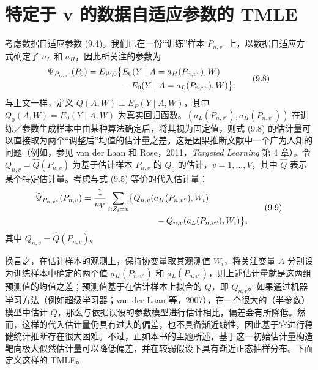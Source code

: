 \section{特定于 v 的数据自适应参数的 TMLE}

考虑数据自适应参数 (9.4)。我们已在一份“训练”样本 $P_{n,v^c}$ 上，以数据自适应方式确定了 $a_L$ 和 $a_H$，因此所关注的参数为
\begin{equation}
\begin{aligned}
\Psi_{P_{n,v^c}}(P_0)
={}&E_{W,0}\bigl\{E_0(Y\mid A=a_H(P_{n,v^c}),W)\\
&\hspace{2.6em}-E_0(Y\mid A=a_L(P_{n,v^c}),W)\bigr\}.
\end{aligned}
\tag{9.8}
\end{equation}
与上文一样，定义 $Q(A,W)\equiv E_P(Y\mid A,W)$，其中 $Q_0(A,W)=E_0(Y\mid A,W)$ 为真实回归函数。$(a_L(P_{n,v^c}),a_H(P_{n,v^c}))$ 在训练／参数生成样本中由某种算法确定后，将其视为固定值，则式 (9.8) 的估计量可以直接取为两个“调整后”均值的估计量之差。这是因果推断文献中一个广为人知的问题（例如，参见 van der Laan 和 Rose，2011，\emph{Targeted Learning} 第 4 章）。令 $Q_{n,v}=\hat Q(P_{n,v})$ 为基于估计样本 $P_{n,v}$ 的 $Q_0$ 的估计，$v=1,\ldots,V$，其中 $\hat Q$ 表示某个特定估计量。考虑与式 (9.5) 等价的代入估计量：
\begin{equation}
\begin{aligned}
\hat\Psi_{P_{n,v^c}}(P_{n,v})
={}&\frac1{n_V}\sum_{i:Z_i=v}\bigl\{Q_{n,v}(a_H(P_{n,v^c}),W_i)\\
&\hspace{7.3em}-Q_{n,v}(a_L(P_{n,v^c}),W_i)\bigr\},
\end{aligned}
\tag{9.9}
\end{equation}
其中 $Q_{n,v}=\hat Q(P_{n,v})$。

换言之，在估计样本的观测上，保持协变量取其观测值 $W_i$，将关注变量 $A$ 分别设为训练样本中确定的两个值 $a_H(P_{n,v^c})$ 和 $a_L(P_{n,v^c})$，则上述估计量就是这两组预测值的均值之差；预测值基于在估计样本上拟合的 $Q$，即 $Q_{n,v}$。如果通过机器学习方法（例如超级学习器；van der Laan 等，2007），在一个很大的（半参数）模型中估计 $Q$，那么与依据误设的参数模型进行估计相比，偏差会有所降低。然而，这样的代入估计量仍具有过大的偏差，也不具备渐近线性，因此基于它进行稳健统计推断存在很大困难。不过，正如本书的主题所述，基于这一初始估计量构造靶向极大似然估计量可以降低偏差，并在较弱假设下具有渐近正态抽样分布。下面定义这样的 TMLE。

